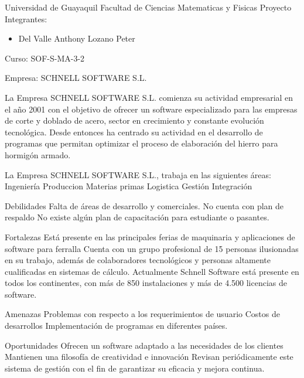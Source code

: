 \begin{center}
Universidad de Guayaquil
Facultad de Ciencias Matematicas y Fisicas
Proyecto
Integrantes:
\begin{itemize}
	\item Del Valle Anthony
Lozano Peter
\end{itemize}
Curso: SOF-S-MA-3-2
\end{center}

Empresa: SCHNELL SOFTWARE S.L.


La Empresa SCHNELL SOFTWARE S.L. comienza su actividad empresarial en el año 2001 con el objetivo de ofrecer un software especializado para las empresas de corte y doblado de acero, sector en crecimiento y constante evolución tecnológica. Desde entonces ha centrado su actividad en el desarrollo de programas que permitan optimizar el proceso de elaboración del hierro para hormigón armado.

La Empresa SCHNELL SOFTWARE S.L., trabaja en las siguientes áreas:
Ingeniería
Produccion
Materias primas
Logistica
Gestión
Integración 

Debilidades
Falta de áreas de desarrollo y comerciales.
No cuenta con plan de respaldo
No existe algún plan de capacitación para estudiante o pasantes.

Fortalezas
Está presente en las principales ferias de maquinaria y aplicaciones de software para ferralla
Cuenta con un grupo profesional de 15 personas ilusionadas en su trabajo, además de colaboradores tecnológicos y personas altamente cualificadas en sistemas de cálculo.
Actualmente Schnell Software está presente en todos los continentes, con más de 850 instalaciones y más de 4.500 licencias de software.

Amenazas
Problemas con respecto a los requerimientos de usuario
Costos de desarrollos 
Implementación de programas en diferentes países.

Oportunidades
Ofrecen un software adaptado a las necesidades de los clientes
Mantienen una filosofía de creatividad e innovación 
Revisan periódicamente este sistema de gestión con el fin de garantizar su eficacia y mejora continua. 
